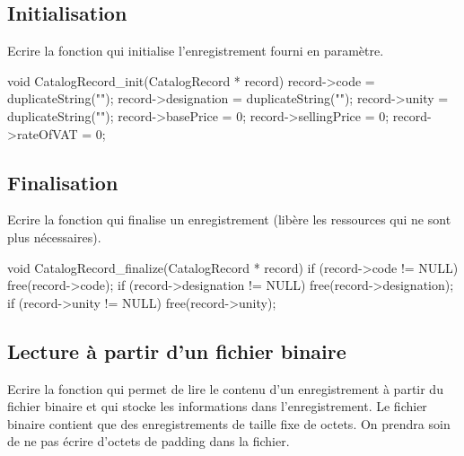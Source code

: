 \subsection{Initialisation}

Ecrire la fonction  qui initialise l'enregistrement fourni en paramètre.
\begin{csourcecorrection}
void CatalogRecord_init(CatalogRecord * record) {
    record->code = duplicateString("");
    record->designation = duplicateString("");
    record->unity = duplicateString("");
    record->basePrice = 0;
    record->sellingPrice = 0;
    record->rateOfVAT = 0;
}
\end{csourcecorrection}

\subsection{Finalisation}

Ecrire la fonction  qui finalise un enregistrement (libère les ressources qui ne sont plus nécessaires).
\begin{csourcecorrection}
void CatalogRecord_finalize(CatalogRecord * record) {
    if (record->code != NULL)
        free(record->code);
    if (record->designation != NULL)
        free(record->designation);
    if (record->unity != NULL)
        free(record->unity);
}
\end{csourcecorrection}

\subsection{Lecture à partir d'un fichier binaire}

Ecrire la fonction  qui permet de lire le contenu d'un enregistrement à partir du fichier binaire et qui stocke les informations dans l'enregistrement. Le fichier binaire contient que des enregistrements de taille fixe de  octets. On prendra soin de ne pas écrire d'octets de padding dans la fichier.

